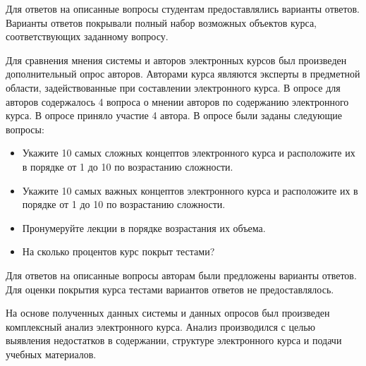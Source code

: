 Для ответов на описанные вопросы студентам предоставлялись варианты ответов. Варианты ответов покрывали полный набор возможных объектов курса, соответствующих заданному вопросу.

Для сравнения мнения системы и авторов электронных курсов был произведен дополнительный опрос авторов. Авторами курса являются эксперты в предметной области, задействованные при составлении электронного курса. В опросе для авторов содержалось 4 вопроса о мнении авторов по содержанию электронного курса. В опросе приняло участие 4 автора. В опросе были заданы следующие вопросы:

\begin{itemize}
\item Укажите 10 самых сложных концептов электронного курса и расположите их в порядке от 1 до 10 по возрастанию сложности.
\item Укажите 10 самых важных концептов электронного курса и расположите их в порядке от 1 до 10 по возрастанию сложности.
\item Пронумеруйте лекции в порядке возрастания их объема. 
\item На сколько процентов курс покрыт тестами?
\end{itemize}

Для ответов на описанные вопросы авторам были предложены варианты ответов. Для оценки покрытия курса тестами вариантов ответов не предоставлялось. 

На основе полученных данных системы и данных опросов был произведен комплексный анализ электронного курса. Анализ производился с целью выявления недостатков в содержании, структуре электронного курса и подачи учебных материалов.

